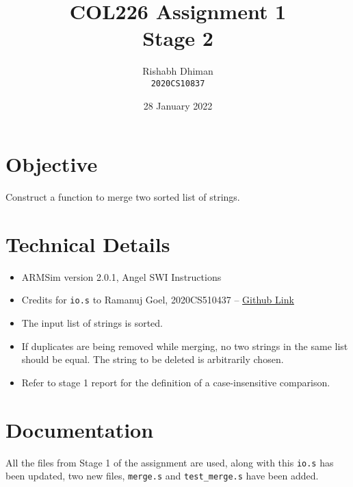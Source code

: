 \documentclass[a4paper]{scrartcl}
\title{COL226 Assignment 1\\{\Large Stage 2}}
\date{28 January 2022}
\author{Rishabh Dhiman\\ \texttt{2020CS10837}}
\theoremstyle{definition}
\renewcommand{\tt}{\texttt}
\begin{document}
\maketitle

\section{Objective}
Construct a function to merge two sorted list of strings.

\section{Technical Details}
\begin{itemize}
	\item ARMSim version 2.0.1, Angel SWI Instructions
	\item Credits for \tt{io.s} to Ramanuj Goel, 2020CS510437 -- \href{https://github.com/taitaisama/Arm_io}{Github Link}
	\item The input list of strings is sorted.
	\item If duplicates are being removed while merging, no two strings in the same list should be equal. The string to be deleted is arbitrarily chosen.
	\item Refer to stage 1 report for the definition of a case-insensitive comparison.
\end{itemize}

\section{Documentation}
All the files from Stage 1 of the assignment are used, along with this \tt{io.s} has been updated, two new files, \tt{merge.s} and \tt{test_merge.s} have been added.
\end{document}
